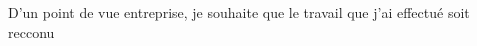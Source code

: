 \documentclass[a4paper, 11pt, french]{report}
\begin{document}
                                                                                                                                                                              D'un
                                                                                                                                                                              point
                                                                                                                                                                              de
                                                                                                                                                                              vue
                                                                                                                                                                              entreprise,
                                                                                                                                                                              je
                                                                                                                                                                              souhaite
                                                                                                                                                                              que
                                                                                                                                                                              le
                                                                                                                                                                              travail
                                                                                                                                                                              que
                                                                                                                                                                              j'ai
                                                                                                                                                                              effectué
                                                                                                                                                                              soit
                                                                                                                                                                              recconu
\end{document}
